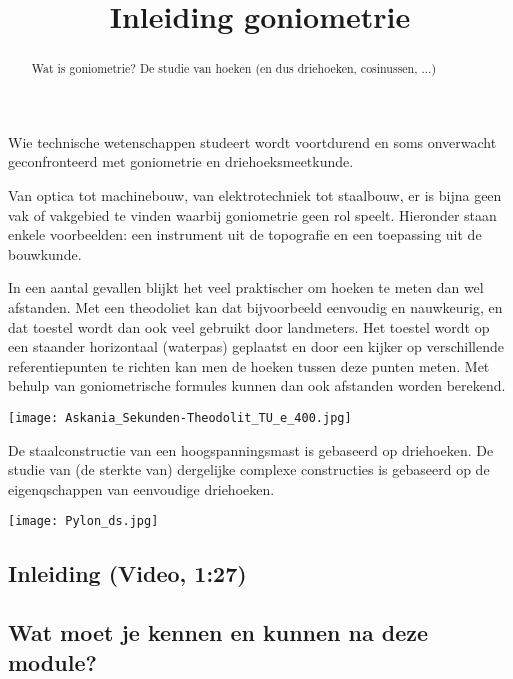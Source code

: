 \documentclass{ximera}
\title[Examples:]{Inleiding goniometrie}
\begin{document}
\begin{abstract}
	Wat is goniometrie? De studie van hoeken (en dus driehoeken, cosinussen, ...)
\end{abstract}
\maketitle

Wie technische wetenschappen studeert wordt voortdurend en soms onverwacht geconfronteerd met goniometrie en driehoeksmeetkunde. 

Van optica tot machinebouw, van elektrotechniek tot staalbouw, er is bijna geen vak of vakgebied te vinden waarbij goniometrie geen rol speelt. Hieronder staan enkele voorbeelden: een instrument uit de topografie en een toepassing uit de bouwkunde.

In een aantal gevallen blijkt het veel praktischer om hoeken te meten dan wel afstanden. Met een theodoliet kan dat bijvoorbeeld eenvoudig en nauwkeurig, en dat toestel wordt dan ook veel gebruikt door landmeters. Het toestel wordt op een staander horizontaal (waterpas) geplaatst en door een kijker op verschillende referentiepunten te richten kan men de hoeken tussen deze punten meten. Met behulp van goniometrische formules kunnen dan ook afstanden worden berekend.
\begin{image}
	\texttt{[image: Askania\_Sekunden-Theodolit\_TU\_e\_400.jpg]}
\end{image}

De staalconstructie van een hoogspanningsmast is gebaseerd op driehoeken. De studie van (de sterkte van) dergelijke complexe constructies is gebaseerd op de eigenqschappen van eenvoudige driehoeken.
\begin{image}
	\texttt{[image: Pylon\_ds.jpg]}
\end{image}


\subsection{Inleiding (Video, 1:27)}
\begin{expandable}
 \begin{center}
 \end{center}
\end{expandable}



\subsection{Wat moet je kennen en kunnen na deze module?}
\end{document}

